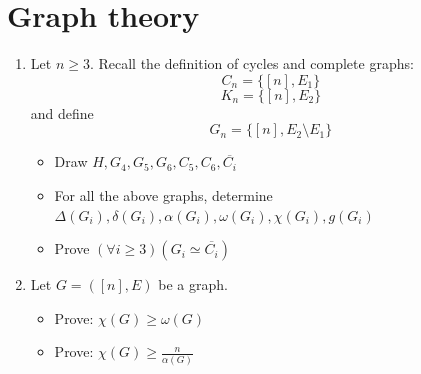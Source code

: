 \documentclass[11pt,paper=b5,footinclude,headinclude]{scrbook} %
\theoremstyle{remark}
\theoremstyle{definition} %
\theoremstyle{theorem} %
\begin{document}
\section{Graph theory}
\begin{enumerate}
\item Let $n\ge 3$. Recall the definition of cycles and complete graphs:
\[C_{n}=\{[n], E_{1}\}\]
\[K_{n}=\{[n], E_{2}\}\]
and define
\[G_{n}=\{[n], E_{2} \setminus E_{1}\}\]
\begin{itemize}
    \item Draw \(H, G_{4}, G_{5}, G_{6}, C_{5}, C_{6}, \overline{C_{i}}\)
    \item For all the above graphs, determine \(\Delta(G_{i}), \delta(G_{i}), \alpha(G_{i}), \omega(G_{i}), \chi(G_{i}), g(G_{i})\)
    \item Prove \((\forall i \geq 3) (G_{i} \simeq \overline{C_{i}})\)
\end{itemize}

\item Let \(G = ([n], E)\) be a graph.
\begin{itemize}
\item Prove: \(\chi (G) \geq \omega (G)\)
\item Prove: \(\chi (G) \geq \frac{n}{\alpha(G)}\)
\end{itemize}

\end{enumerate}
\
\end{document}
